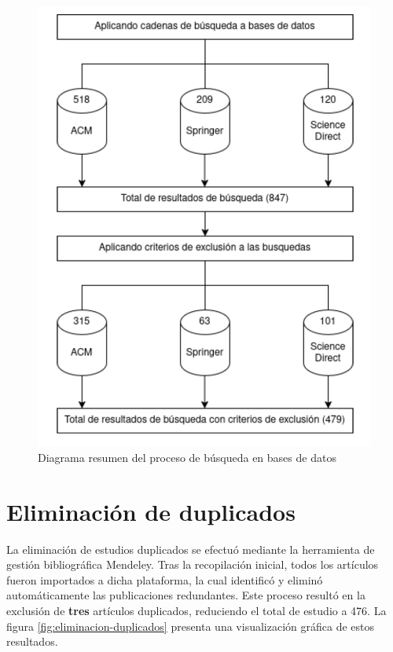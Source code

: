 \begin{figure}[H]
	\centering
	\includegraphics[scale=0.6] {tablas-images/sms/resumen_busqueda_bases.png}
	\caption{Diagrama resumen del proceso de búsqueda en bases de datos}\label{fig:resumen-busqueda-bases-de-datos}
\end{figure}




\section{Eliminación de duplicados}\label{sec:eliminacionDuplicados}
\noindent
La eliminación de estudios duplicados se efectuó mediante la herramienta de gestión bibliográfica Mendeley. Tras la recopilación inicial, todos los artículos fueron importados a dicha plataforma, la cual identificó y eliminó automáticamente las publicaciones redundantes. Este proceso resultó en la exclusión de \textbf{tres} artículos duplicados, reduciendo el total de estudio a 476. La figura \ref{fig:eliminacion-duplicados} presenta una visualización gráfica de estos resultados.


